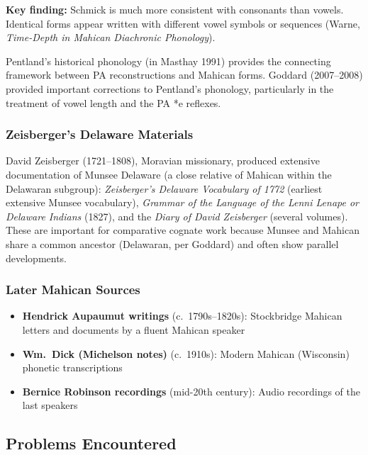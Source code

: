 \textbf{Key finding:} Schmick is much more consistent with consonants than
vowels. Identical forms appear written with different vowel symbols or
sequences (Warne, \emph{Time-Depth in Mahican Diachronic Phonology}).

Pentland's historical phonology (in Masthay 1991) provides the connecting
framework between PA reconstructions and Mahican forms. Goddard (2007--2008)
provided important corrections to Pentland's phonology, particularly in the
treatment of vowel length and the PA *e reflexes.

\subsubsection{Zeisberger's Delaware Materials}

David Zeisberger (1721--1808), Moravian missionary, produced extensive
documentation of Munsee Delaware (a close relative of Mahican within the
Delawaran subgroup): \emph{Zeisberger's Delaware Vocabulary of 1772} (earliest
extensive Munsee vocabulary), \emph{Grammar of the Language of the Lenni
Lenape or Delaware Indians} (1827), and the \emph{Diary of David Zeisberger}
(several volumes). These are important for comparative cognate work because
Munsee and Mahican share a common ancestor (Delawaran, per Goddard) and often
show parallel developments.

\subsubsection{Later Mahican Sources}

\begin{itemize}
  \item \textbf{Hendrick Aupaumut writings} (c.\ 1790s--1820s): Stockbridge
    Mahican letters and documents by a fluent Mahican speaker
  \item \textbf{Wm.\ Dick (Michelson notes)} (c.\ 1910s): Modern Mahican
    (Wisconsin) phonetic transcriptions
  \item \textbf{Bernice Robinson recordings} (mid-20th century): Audio
    recordings of the last speakers
\end{itemize}

\subsection{Problems Encountered}

